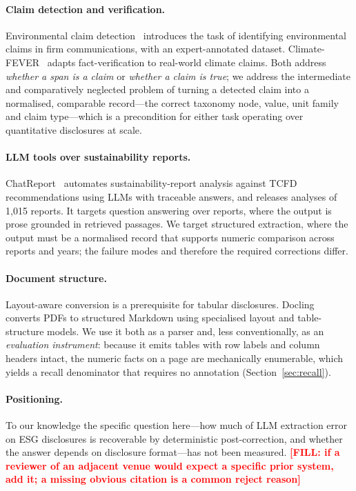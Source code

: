 \documentclass[3p,times]{elsarticle}
\newcommand{\FILL}[1]{\textcolor{red}{\textbf{[FILL: #1]}}}
\begin{document}
\paragraph{Claim detection and verification.} Environmental claim
detection~\cite{stammbach2023environmental} introduces the task of identifying
environmental claims in firm communications, with an expert-annotated dataset.
Climate-FEVER~\cite{diggelmann2020climatefever} adapts fact-verification to
real-world climate claims. Both address \emph{whether a span is a claim} or
\emph{whether a claim is true}; we address the intermediate and comparatively
neglected problem of turning a detected claim into a normalised, comparable
record---the correct taxonomy node, value, unit family and claim type---which is
a precondition for either task operating over quantitative disclosures at scale.

\paragraph{LLM tools over sustainability reports.}
ChatReport~\cite{ni2023chatreport} automates sustainability-report analysis
against TCFD recommendations using LLMs with traceable answers, and releases
analyses of 1{,}015 reports. It targets question answering over reports, where
the output is prose grounded in retrieved passages. We target structured
extraction, where the output must be a normalised record that supports numeric
comparison across reports and years; the failure modes and therefore the required
corrections differ.

\paragraph{Document structure.} Layout-aware conversion is a prerequisite for
tabular disclosures. Docling~\cite{auer2024docling} converts PDFs to structured
Markdown using specialised layout and table-structure models. We use it both as a
parser and, less conventionally, as an \emph{evaluation instrument}: because it
emits tables with row labels and column headers intact, the numeric facts on a
page are mechanically enumerable, which yields a recall denominator that requires
no annotation (Section~\ref{sec:recall}).

\paragraph{Positioning.} To our knowledge the specific question here---how much of
LLM extraction error on ESG disclosures is recoverable by deterministic
post-correction, and whether the answer depends on disclosure format---has not
been measured. \FILL{if a reviewer of an adjacent venue would expect a specific
prior system, add it; a missing obvious citation is a common reject reason}
\end{document}
